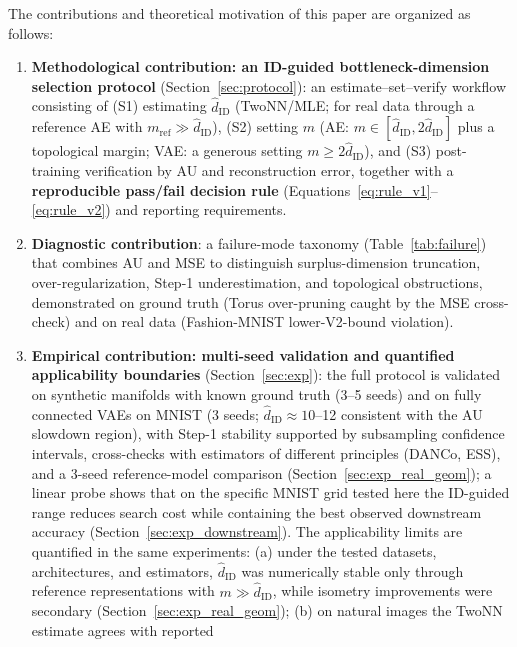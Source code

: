 \documentclass[make,article,submit,pdftex,moreauthors]{Definitions/mdpi}
\newcommand{\hatdID}{\hat{d}_{\mathrm{ID}}}
\begin{document}
The contributions and theoretical motivation of this paper are organized as
follows:
\begin{enumerate}
  \item \textbf{Methodological contribution: an ID-guided
        bottleneck-dimension selection protocol}
        (Section~\ref{sec:protocol}): an estimate--set--verify workflow
        consisting of
        (S1) estimating $\hatdID$ (TwoNN/MLE; for real data through a
        reference AE with $m_{\mathrm{ref}} \gg \hatdID$),
        (S2) setting $m$ (AE: $m \in [\hatdID, 2\hatdID]$ plus a topological
        margin; VAE: a generous setting $m \geq 2\hatdID$), and
        (S3) post-training verification by AU and reconstruction error,
        together with a \textbf{reproducible pass/fail decision rule}
        (Equations~\eqref{eq:rule_v1}--\eqref{eq:rule_v2}) and reporting
        requirements.
  \item \textbf{Diagnostic contribution}: a failure-mode taxonomy
        (Table~\ref{tab:failure}) that combines AU and MSE to distinguish
        surplus-dimension truncation, over-regularization, Step-1
        underestimation, and topological obstructions, demonstrated on
        ground truth (Torus over-pruning caught by the MSE cross-check) and
        on real data (Fashion-MNIST lower-V2-bound violation).
  \item \textbf{Empirical contribution: multi-seed validation and
        quantified applicability boundaries} (Section~\ref{sec:exp}):
        the full protocol is validated on synthetic manifolds with known
        ground truth (3--5 seeds) and on fully connected VAEs on MNIST
        (3 seeds; $\hatdID \approx 10$--12 consistent with the AU slowdown
        region), with Step-1 stability supported by subsampling confidence
        intervals, cross-checks with estimators of different principles
        (DANCo, ESS), and a 3-seed reference-model comparison
        (Section~\ref{sec:exp_real_geom}); a linear probe shows that on the
        specific MNIST grid tested here the ID-guided range reduces search
        cost while containing the best observed downstream accuracy
        (Section~\ref{sec:exp_downstream}).
        The applicability limits are quantified in the same experiments:
        (a) under the tested datasets, architectures, and estimators,
        $\hatdID$ was numerically stable only through reference
        representations with $m \gg \hatdID$, while isometry improvements
        were secondary (Section~\ref{sec:exp_real_geom});
        (b) on natural images the TwoNN estimate agrees with reported

\end{enumerate}
\end{document}
